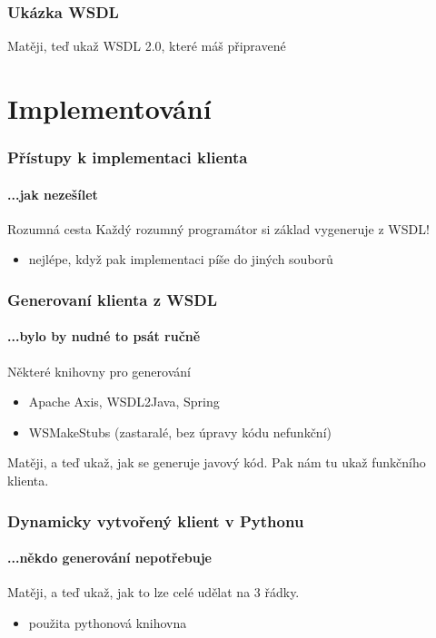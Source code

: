 \documentclass[12pt]{beamer}
\begin{document}
\begin{frame}
  \frametitle{Ukázka WSDL}

  \begin{example}
    Matěji, teď ukaž WSDL 2.0, které máš připravené
  \end{example}
\end{frame}

\section{Implementování}

\begin{frame}
  \frametitle{Přístupy k implementaci klienta}
  \framesubtitle{...jak nezešílet}

  \begin{alertblock}{Rozumná cesta}
    Každý rozumný programátor si základ vygeneruje z WSDL!
    \begin{itemize}
      \item nejlépe, když pak implementaci píše do jiných souborů
    \end{itemize}
  \end{alertblock}
\end{frame}

\begin{frame}
  \frametitle{Generovaní klienta z WSDL}
  \framesubtitle{...bylo by nudné to psát ručně}

	\begin{block}{Některé knihovny pro generování}
		\begin{itemize}
			\item {} Apache Axis, WSDL2Java, Spring
			\item {} WSMakeStubs (zastaralé, bez úpravy kódu nefunkční)
		\end{itemize}    	
  \end{block}
	\begin{example}
		Matěji, a teď ukaž, jak se generuje javový kód. Pak nám tu ukaž funkčního klienta.
	\end{example}
\end{frame}

\begin{frame}
  \frametitle{Dynamicky vytvořený klient v Pythonu}
  \framesubtitle{...někdo generování nepotřebuje}

  \begin{example}
    Matěji, a teď ukaž, jak to lze celé udělat na 3 řádky.
    \begin{itemize}
      \item použita pythonová knihovna 
    \end{itemize}
  \end{example}
\end{frame}
\end{document}
